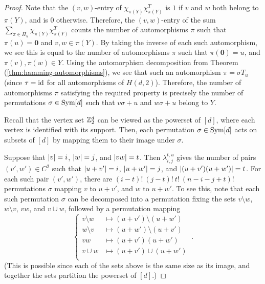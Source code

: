 \documentclass{report}
\newcommand{\wt}[1]{\abs{ #1 }}
\newcommand{\vzero}{\mathbf{0}}
\newcommand{\chipiY}{\chi_{\pi(Y)}}
\begin{document}
    \begin{proof}

      Note that the $(v, w)$-entry of $\chipiY \chipiY^T$ is $1$ if $v$ and $w$
      both belong to $\pi(Y)$, and is $0$ otherwise.  Therefore, the $(v,
      w)$-entry of the sum $\sum_{\pi \in \Pi_u} \chipiY \chipiY^T$ counts the
      number of automorphisms $\pi$ such that $\pi(u) = \vzero$ and $v, w \in
      \pi(Y)$.  By taking the inverse of each such automorphism, we see this is
      equal to the number of automorphisms $\pi$ such that $\pi(\vzero) = u$,
      and $\pi(v), \pi(w) \in Y$.  Using the automorphism decomposition from
      Theorem (\ref{thm:hamming-automorphisms}), we see that such an
      automorphism $\pi = \sigma T_u$ (since $\tau = \operatorname{id}$ for all automorphisms
      of $H(d, 2)$).  Therefore, the number of automorphisms $\pi$ satisfying
      the required property is precisely the number of permutations $\sigma \in
      \operatorname{Sym}[d]$ such that $v\sigma + u$ and $w\sigma +u$ belong to $Y$.

      Recall that the vertex set $\mathbb{Z}_2^d$ can be viewed as the powerset of
      $[d]$, where each vertex is identified with its support.  Then, each
      permutation $\sigma \in \operatorname{Sym}[d]$ acts on subsets of $[d]$ by mapping them
      to their image under $\sigma$.

      Suppose that $\wt{v} = i$, $\wt{w} = j$, and $\wt{vw} = t$.  Then
      $\lambda_{i, j}^{t, u}$ gives the number of pairs $(v', w') \in C^2$ such
      that $\wt{u+v'} = i$, $\wt{u+w'} = j$, and $\wt{(u+v')(u+w')} = t$.  For
      each such pair $(v', w')$, there are $(i-t)!\ (j-t)!\ t!\ (n-i-j+t)!$
      permutations $\sigma$ mapping $v$ to $u + v'$, and $w$ to $u + w'$.  To
      see this, note that each such permutation $\sigma$ can be decomposed into
      a permutation fixing the sets $v \setminus w$, $w \setminus v$, $vw$, and
      $v \cup w$, followed by a permutation mapping
      $$
      \begin{cases}
        v \setminus w &\mapsto (u+v') \setminus (u+w') \\
        w \setminus v &\mapsto (u+w') \setminus (u+v') \\
        vw            &\mapsto (u+v')(u+w') \\
        v \cup w      &\mapsto (u+v') \cup (u+w') \\
      \end{cases} \ .
      $$
      (This is possible since each of the sets above is the same size as its
      image, and together the sets partition the powerset of $[d]$.)

    \end{proof}
\end{document}
